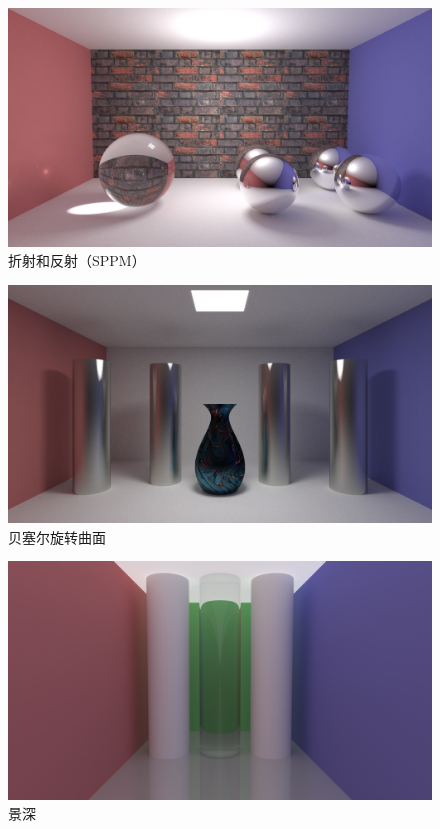 \documentclass[cn]{report}
\begin{document}
    \begin{figure}[htbp]
        \centering
        \includegraphics[width=\linewidth]{../results/cornell-2ball-sppm.png}
        \caption{折射和反射（SPPM）}
        \label{fig:cornell-2ball-sppm}
    \end{figure}

    \begin{figure}[htbp]
        \centering
        \includegraphics[width=\linewidth]{../results/cornell-bezier.png}
        \caption{贝塞尔旋转曲面}
        \label{fig:bezier}
    \end{figure}

    \begin{figure}[htbp]
        \centering
        \includegraphics[width=\linewidth]{../results/bleeding.png}
        \caption{景深}
        \label{fig:bleeding}
    \end{figure}
\end{document}
